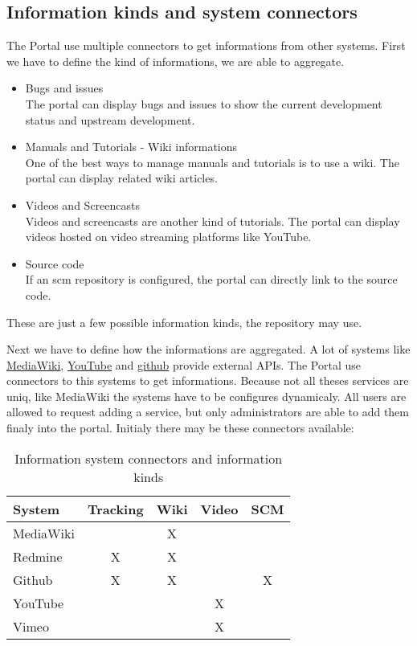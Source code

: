 \subsection[sec:information kinds and system connectors]{Information kinds and system connectors}

The Portal use multiple connectors to get informations from other systems.
First we have to define the kind of informations, we are able to aggregate.

\begin{itemize}
\item Bugs and issues\\
The portal can display bugs and issues to show the current development status and upstream development.
\item Manuals and Tutorials - Wiki informations\\
One of the best ways to manage manuals and tutorials is to use a wiki. The portal can display related wiki articles.
\item Videos and Screencasts\\
Videos and screencasts are another kind of tutorials. The portal can display videos hosted on video streaming platforms like YouTube.
\item Source code\\
If an scm repository is configured, the portal can directly link to the source code.
\end{itemize}

These are just a few possible information kinds, the repository may use.

Next we have to define how the informations are aggregated.
A lot of systems like \href{http://www.mediawiki.org/wiki/API:Main_page/de}{MediaWiki}, \href{http://code.google.com/intl/de-DE/apis/youtube/overview.html}{YouTube} and \href{http://developer.github.com/v3/}{github} provide external APIs.
The Portal use connectors to this systems to get informations.
Because not all theses services are uniq, like MediaWiki the systems have to be configures dynamicaly.
All users are allowed to request adding a service, but only administrators are able to add them finaly into the portal.
Initialy there may be these connectors available:

\small
\begin{longtable}{|p{}|c|c|c|c}
\caption{Information system connectors and information kinds} \\
\hline
\label{tab:information system connectors and information kinds}
\textbf{System} & \textbf{Tracking} & \textbf{Wiki} & \textbf{Video} & \textbf{SCM}
\\ \hline
 MediaWiki & & X & &
\\ \hline
 Redmine & X & X & &
\\ \hline
 Github & X & X & & X
\\ \hline
 YouTube & & & X &
\\ \hline
 Vimeo & & & X &
\\ \hline
\end{longtable}
\normalsize

